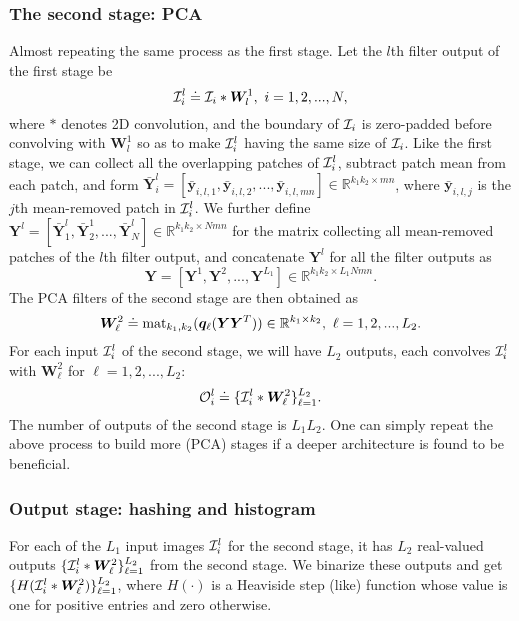 \documentclass[10pt,journal,compsoc]{IEEEtran}
\begin{document}
\subsubsection{\bf The second stage: PCA}
Almost repeating the same process as the first stage. Let the $l$th filter output of the first stage be
\begin{equation}
{\cal I}_i^l \doteq {\cal I}_i*\bm{ W}^1_l,~i = 1,2,...,N,
\end{equation}where $*$ denotes 2D convolution, and the boundary of ${\cal I}_i$ is zero-padded before convolving with $\bm{ W}^1_l$ so as to make ${\cal I}_i^l$ having the same size of ${\cal I}_i$. Like the first stage, we can collect all the overlapping patches of ${\cal I}_i^l$, subtract patch mean from each patch, and form $\bar{\bm{ Y}}^l_i = [\bar{\bm{ y}}_{i,l,1},\bar{\bm{ y}}_{i,l,2},...,\bar{\bm{ y}}_{i,l,mn}]\in\mathbb{R}^{k_1k_2 \times mn}$, where $\bar{\bm{ y}}_{i,l,j}$ is the $j$th mean-removed patch in ${\cal I}_i^l$. We further define $
\bm{ Y}^l = [\bar{\bm{ Y}}^l_1,\bar{\bm{ Y}}^1_2,...,\bar{\bm{ Y}}^l_N]\in\mathbb{R}^{k_1k_2 \times Nmn}$ for the matrix collecting all mean-removed patches of the $l$th filter output, and concatenate $\bm{ Y}^l$ for all the filter outputs as
\begin{equation}
\bm{ Y} = [\bm{ Y}^1,\bm{ Y}^2,...,\bm{ Y}^{L_1}]\in\mathbb{R}^{k_1k_2 \times L_1Nmn}.
\end{equation}
The PCA filters of the second stage are then obtained as
\begin{equation}\label{eq: PCAfilter2}
\bm{ W}^2_{\ell} \doteq {\rm mat}_{k_1,k_2}(\bm{ q}_{\ell}(\bm{ Y}\bm{ Y}^T))\in\mathbb{R}^{k_1 \times k_2},~{\ell} = 1,2,...,L_2.
\end{equation}For each input ${\cal I}_i^l$ of the second stage, we will have $L_2$ outputs, each convolves ${\cal I}_i^l$ with $\bm{ W}^2_{\ell}$ for $\ell = 1,2,...,L_2$:
\begin{equation}
{\cal O}_i^{l} \doteq \{{\cal I}_i^l*\bm{ W}^2_{\ell}\}_{\ell=1}^{L_2}.
\end{equation}The number of outputs of the second stage is $L_1L_2$. One can simply repeat the above process to build more (PCA) stages if a deeper architecture is found to be beneficial.

\subsubsection{\bf Output stage: hashing and histogram}
For each of the $L_1$ input images ${\cal I}_i^l$ for the second stage, it has $L_2$ real-valued outputs $\{{\cal I}_i^l*\bm{ W}^2_{\ell}\}_{\ell=1}^{L_2}$ from the second stage. We binarize these outputs and get $\{H({\cal I}_i^l*\bm{  W}^2_{\ell})\}_{\ell = 1}^{L_2}$, where $H(\cdot)$ is a Heaviside step (like) function whose value is one for positive entries and zero otherwise.
\end{document}
